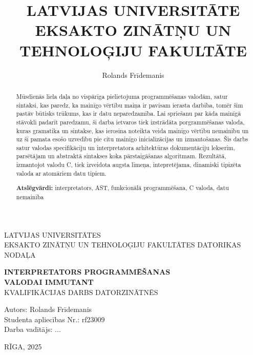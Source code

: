 \documentclass[12pt,a4paper]{report}
\title{LATVIJAS UNIVERSITĀTE
EKSAKTO ZINĀTŅU UN TEHNOLOĢIJU FAKULTĀTE}
\author{Rolands Frīdemanis}
\begin{document}
\begin{titlepage}
    \centering
    
    {\Large LATVIJAS UNIVERSITĀTES\\EKSAKTO ZINĀTŅU UN TEHNOLOĢIJU FAKULTĀTES DATORIKAS NODAĻA\\[5cm]}
    
    {\LARGE \textbf{ INTERPRETATORS PROGRAMMĒŠANAS\\[0.3cm] VALODAI IMMUTANT}}\\[0.5cm]

    \normalsize{KVALIFIKĀCIJAS DARBS DATORZINĀTNĒS}\\[5cm]
    
    \begin{flushleft}
        Autors: Rolands Frīdemanis\\
        Studenta apliecības Nr.: rf23009\\
        Darba vadītājs: ...
    \end{flushleft}
    
    \vfill
    RĪGA, 2025
\end{titlepage}

\begin{abstract}
    Mūsdienās liela daļa no vispārīga pielietojuma programmēšanas valodām, satur sintaksi, kas paredz, ka mainīgo vērtību maiņa ir pavisam ierasta darbība, tomēr šim pastāv būtisks trūkums, kas ir datu neparedzamība. 
    Lai spriešanu par kāda mainīgā stāvokli padarīt paredzamu, šī darba ietvaros tiek izstrādāta porgrammēšanas valoda, kuras gramatika un sintakse, kas ierosina noteikta veida mainīgo vērtību nemainību un uz šī pamata esošo uzvedību pie citu mainīgo inicializācijas un izmantošanas.
    Šis darbs satur valodas specifikāciju un interpretatora arhitektūras dokumentāciju lekserim, parsētājam un abstraktā sintakses koka pārstaigāšanas algoritmam.
    Rezultātā, izmantojot valodu C, tiek izveidota augsta līmeņa, intepretējama, dinamiski tipizēta valoda ar atomāriem datu tipiem.

    \begin{flushleft}
    \textbf{Atslēgvārdi:} interpretators, AST, funkcionālā programmēšana, C valoda, datu nemainība
    \end{flushleft}
\end{abstract} 
\end{document}
